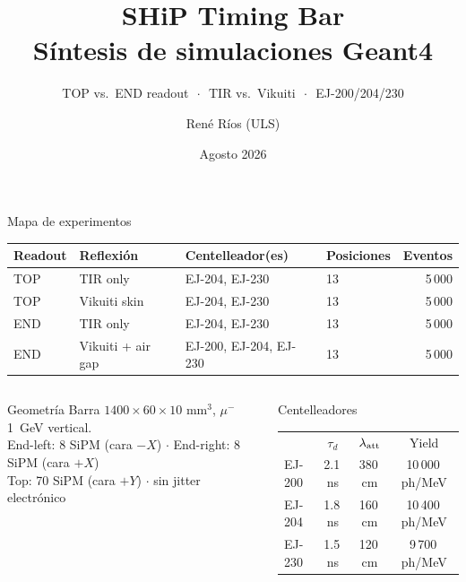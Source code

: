 \documentclass[aspectratio=169,9pt]{beamer}
\title{SHiP Timing Bar\\S\'intesis de simulaciones Geant4}
\subtitle{TOP vs.\ END readout $\,\cdot\,$ TIR vs.\ Vikuiti $\,\cdot\,$ EJ-200/204/230}
\author{Ren\'e R\'ios (ULS)}
\institute{Resumen interno de simulaci\'on}
\date{Agosto 2026}
\begin{document}
\begin{frame}
  \titlepage
\end{frame}

\begin{frame}{Mapa de experimentos}
  \centering
  \begin{tabular}{llllr}
    \toprule
    Readout & Reflexi\'on & Centelleador(es) & Posiciones & Eventos \\
    \midrule
    TOP  & TIR only      & EJ-204, EJ-230        & 13 & 5\,000 \\
    TOP  & Vikuiti skin  & EJ-204, EJ-230        & 13 & 5\,000 \\
    END  & TIR only      & EJ-204, EJ-230        & 13 & 5\,000 \\
    END  & Vikuiti + air gap & EJ-200, EJ-204, EJ-230 & 13 & 5\,000 \\
    \bottomrule
  \end{tabular}

  \vspace{0.5em}
  \begin{columns}[T]
    \begin{block}{Geometr\'ia}
      Barra $1400\times60\times10$ mm$^3$, $\mu^-$ \SI{1}{GeV} vertical.\\
      End-left: 8 SiPM (cara $-X$) $\cdot$ End-right: 8 SiPM (cara $+X$)\\
      Top: 70 SiPM (cara $+Y$) $\cdot$ sin jitter electr\'onico
    \end{block}
    \begin{block}{Centelleadores}
      \begin{tabular}{lccc}
        & $\tau_d$ & $\lambda_{\rm att}$ & Yield \\
        EJ-200 & 2.1\,ns & 380\,cm & 10\,000\,ph/MeV \\
        EJ-204 & 1.8\,ns & 160\,cm & 10\,400\,ph/MeV \\
        EJ-230 & 1.5\,ns & 120\,cm &  9\,700\,ph/MeV \\
      \end{tabular}
    \end{block}
  \end{columns}
\end{frame}
\end{document}
